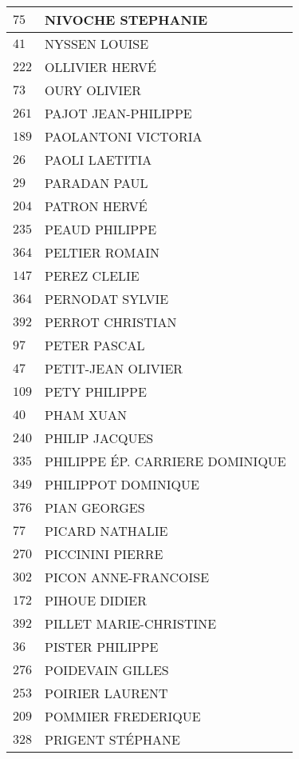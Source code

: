 \begin{xltabular}{\linewidth}{|l|X|}
    \hline
    $75$ & NIVOCHE STEPHANIE \\
    \hline
    $41$ & NYSSEN LOUISE \\
    \hline
    $222$ & OLLIVIER HERVÉ \\
    \hline
    $73$ & OURY OLIVIER \\
    \hline
    $261$ & PAJOT JEAN-PHILIPPE \\
    \hline
    $189$ & PAOLANTONI VICTORIA \\
    \hline
    $26$ & PAOLI LAETITIA \\
    \hline
    $29$ & PARADAN PAUL \\
    \hline
    $204$ & PATRON HERVÉ \\
    \hline
    $235$ & PEAUD PHILIPPE \\
    \hline
    $364$ & PELTIER ROMAIN \\
    \hline
    $147$ & PEREZ CLELIE \\
    \hline
    $364$ & PERNODAT SYLVIE \\
    \hline
    $392$ & PERROT CHRISTIAN \\
    \hline
    $97$ & PETER PASCAL \\
    \hline
    $47$ & PETIT-JEAN OLIVIER \\
    \hline
    $109$ & PETY PHILIPPE \\
    \hline
    $40$ & PHAM XUAN \\
    \hline
    $240$ & PHILIP JACQUES \\
    \hline
    $335$ & PHILIPPE ÉP. CARRIERE DOMINIQUE \\
    \hline
    $349$ & PHILIPPOT DOMINIQUE \\
    \hline
    $376$ & PIAN GEORGES \\
    \hline
    $77$ & PICARD NATHALIE \\
    \hline
    $270$ & PICCININI PIERRE \\
    \hline
    $302$ & PICON ANNE-FRANCOISE \\
    \hline
    $172$ & PIHOUE DIDIER \\
    \hline
    $392$ & PILLET MARIE-CHRISTINE \\
    \hline
    $36$ & PISTER PHILIPPE \\
    \hline
    $276$ & POIDEVAIN GILLES \\
    \hline
    $253$ & POIRIER LAURENT \\
    \hline
    $209$ & POMMIER FREDERIQUE \\
    \hline
    $328$ & PRIGENT STÉPHANE \\

\end{xltabular}
